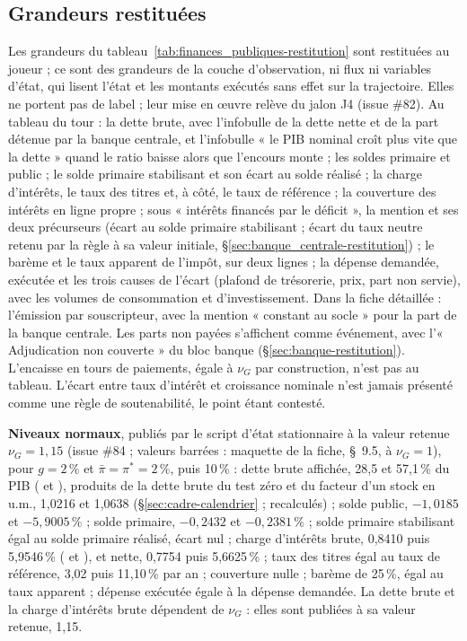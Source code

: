 \documentclass[11pt,a4paper]{article}
\newcommand{\barre}[1]{\leavevmode\sbox{\boitebarre}{#1}\rlap{\rule[0.6ex]{\wd\boitebarre}{0.4pt}}\usebox{\boitebarre}}
\begin{document}
\subsection{Grandeurs restituées}
\label{sec:finances_publiques-restitution}
\begin{proposee}
Les grandeurs du tableau~\ref{tab:finances_publiques-restitution} sont restituées au joueur ; ce sont des grandeurs de la couche d'observation, ni flux ni variables d'état, qui lisent l'état et les montants exécutés sans effet sur la trajectoire. Elles ne portent pas de label ; leur mise en œuvre relève du jalon J4 (issue \#82). Au tableau du tour : la dette brute, avec l'infobulle de la dette nette et de la part détenue par la banque centrale, et l'infobulle « le PIB nominal croît plus vite que la dette » quand le ratio baisse alors que l'encours monte ; les soldes primaire et public ; le solde primaire stabilisant et son écart au solde réalisé ; la charge d'intérêts, le taux des titres et, à côté, le taux de référence ; la couverture des intérêts en ligne propre ; sous « intérêts financés par le déficit », la mention et ses deux précurseurs (écart au solde primaire stabilisant ; écart du taux neutre retenu par la règle à sa valeur initiale, \S\ref{sec:banque_centrale-restitution}) ; le barème et le taux apparent de l'impôt, sur deux lignes ; la dépense demandée, exécutée et les trois causes de l'écart (plafond de trésorerie, prix, part non servie), avec les volumes de consommation et d'investissement. Dans la fiche détaillée : l'émission par souscripteur, avec la mention « constant au socle » pour la part de la banque centrale. Les parts non payées s'affichent comme événement, avec l'« Adjudication non couverte » du bloc banque (\S\ref{sec:banque-restitution}). L'encaisse en tours de paiements, égale à $\nu_G$ par construction, n'est pas au tableau. L'écart entre taux d'intérêt et croissance nominale n'est jamais présenté comme une règle de soutenabilité, le point étant contesté.

\textbf{Niveaux normaux}, publiés par le script d'état stationnaire à la valeur retenue $\nu_G = 1{,}15$ (issue \#84 ; valeurs barrées : maquette de la fiche, \S~9.5, à $\nu_G = 1$), pour $g = 2\,\%$ et $\bar\pi = \pi^\ast = 2\,\%$, puis 10\,\% : dette brute affichée, 28,5 et 57,1\,\% du PIB (\barre{28,2} et \barre{56,7\,\%}), produits de la dette brute du test zéro et du facteur d'un stock en u.m., 1,0216 et 1,0638 (\S\ref{sec:cadre-calendrier} ; recalculés) ; solde public, $-1{,}0185$ et $-5{,}9005\,\%$ ; solde primaire, $-0{,}2432$ et $-0{,}2381\,\%$ ; solde primaire stabilisant égal au solde primaire réalisé, écart nul ; charge d'intérêts brute, 0,8410 puis 5,9546\,\% (\barre{0,8324} et \barre{5,9162\,\%}), et nette, 0,7754 puis 5,6625\,\% ; taux des titres égal au taux de référence, 3,02 puis 11,10\,\% par an ; couverture nulle ; barème de 25\,\%, égal au taux apparent ; dépense exécutée égale à la dépense demandée. La dette brute et la charge d'intérêts brute dépendent de $\nu_G$ : elles sont publiées à sa valeur retenue, 1,15.


\end{proposee}
\end{document}
